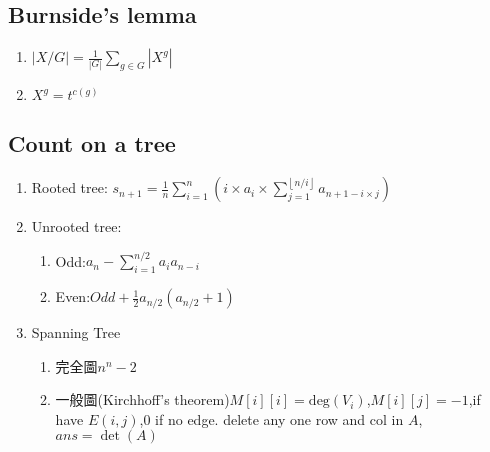 \subsection{Burnside's lemma}
\begin{enumerate}\itemsep = -3pt
	\item $|X/G| = \frac{1}{|G|}\sum_{g \in G}|X^g|$
	\item $X^g=t^{c(g)}$
\end{enumerate}
\subsection{Count on a tree}
\begin{enumerate}\itemsep = -3pt
	\item Rooted tree: $s_{n+1}=\frac{1}{n}\sum_{i=1}^{n}(i\times a_i\times \sum_{j=1}^{\left \lfloor  n/i\right \rfloor} a_{n+1-i\times j})$
	\item Unrooted tree: 
	\begin{enumerate}\itemsep = -2pt
		\item Odd:$a_n-\sum_{i=1}^{n/2}a_ia_{n-i}$
		\item Even:$Odd+\frac{1}{2}a_{n/2}(a_{n/2}+1)$
	\end{enumerate}
	\item Spanning Tree
	\begin{enumerate}\itemsep = -2pt
		\item 完全圖$n^n-2$
		\item 一般圖(Kirchhoff's theorem)$M[i][i]=\text{deg}(V_i)$,$M[i][j]=-1$,if have $E(i,j)$,$0$ if no edge. delete any one row and col in $A$, $ans = \det(A)$
	\end{enumerate}
\end{enumerate}

%
